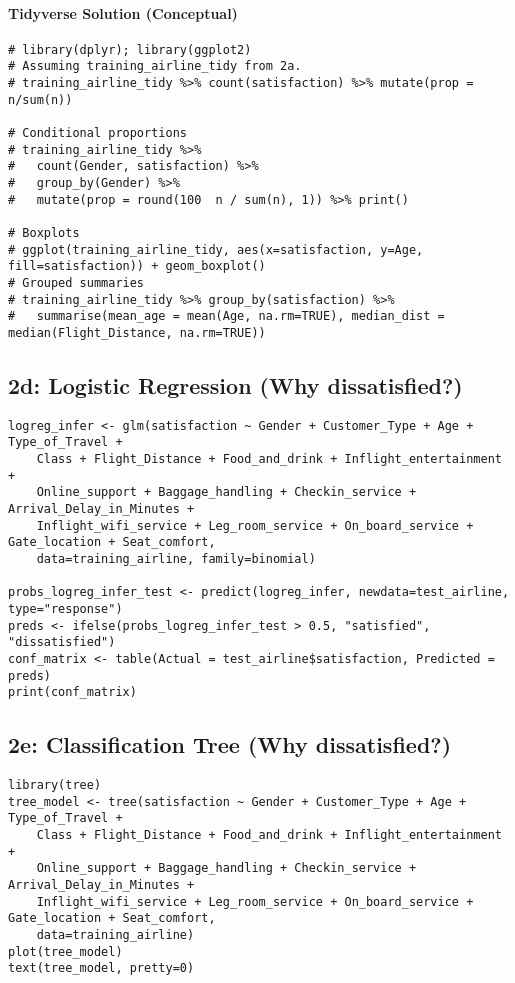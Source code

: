 \documentclass[12pt,a4paper]{article}
\begin{document}
        \paragraph{Tidyverse Solution (Conceptual)}
\begin{lstlisting}
# library(dplyr); library(ggplot2)
# Assuming training_airline_tidy from 2a.
# training_airline_tidy %>% count(satisfaction) %>% mutate(prop = n/sum(n))

# Conditional proportions
# training_airline_tidy %>%
#   count(Gender, satisfaction) %>%
#   group_by(Gender) %>%
#   mutate(prop = round(100  n / sum(n), 1)) %>% print()

# Boxplots
# ggplot(training_airline_tidy, aes(x=satisfaction, y=Age, fill=satisfaction)) + geom_boxplot()
# Grouped summaries
# training_airline_tidy %>% group_by(satisfaction) %>% 
#   summarise(mean_age = mean(Age, na.rm=TRUE), median_dist = median(Flight_Distance, na.rm=TRUE))
\end{lstlisting}

\subsection{2d: Logistic Regression (Why dissatisfied?)}

\begin{lstlisting}[caption={2d: Logistic Regression - Inferential (airline)}]
logreg_infer <- glm(satisfaction ~ Gender + Customer_Type + Age + Type_of_Travel +
    Class + Flight_Distance + Food_and_drink + Inflight_entertainment +
    Online_support + Baggage_handling + Checkin_service + Arrival_Delay_in_Minutes +
    Inflight_wifi_service + Leg_room_service + On_board_service + Gate_location + Seat_comfort,
    data=training_airline, family=binomial)

probs_logreg_infer_test <- predict(logreg_infer, newdata=test_airline, type="response")
preds <- ifelse(probs_logreg_infer_test > 0.5, "satisfied", "dissatisfied")
conf_matrix <- table(Actual = test_airline$satisfaction, Predicted = preds)
print(conf_matrix)
\end{lstlisting}

\subsection{2e: Classification Tree (Why dissatisfied?)}

\begin{lstlisting}[caption={2e: Classification Tree - Inferential}]
library(tree)
tree_model <- tree(satisfaction ~ Gender + Customer_Type + Age + Type_of_Travel +
    Class + Flight_Distance + Food_and_drink + Inflight_entertainment +
    Online_support + Baggage_handling + Checkin_service + Arrival_Delay_in_Minutes +
    Inflight_wifi_service + Leg_room_service + On_board_service + Gate_location + Seat_comfort,
    data=training_airline)
plot(tree_model)
text(tree_model, pretty=0)
\end{lstlisting}
\end{document}
